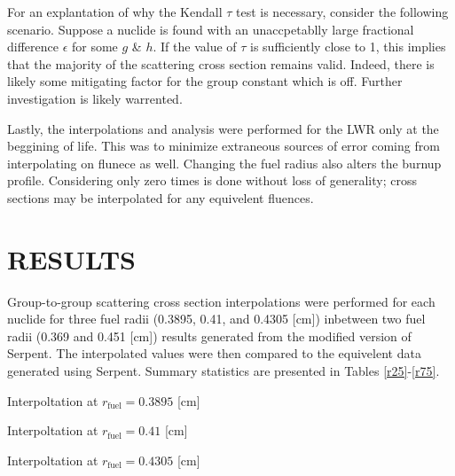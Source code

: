 \documentclass{physor2012}
\begin{document}
For an explantation of why the Kendall $\tau$ test is necessary, consider the following
scenario.  Suppose a nuclide is found with an unaccpetablly large fractional 
difference $\epsilon$ for some $g$ \& $h$.  If the value of $\tau$ is sufficiently
close to 1, this implies that the majority of the scattering cross section 
remains valid.  Indeed, there is likely some mitigating factor for the 
group constant which is off.  Further investigation is likely warrented.

Lastly, the interpolations and analysis were performed for the LWR only
at the beggining of life.  This was to minimize extraneous sources of error
coming from interpolating on flunece as well.  Changing the fuel radius also 
alters the burnup profile.  Considering only zero times is done without
loss of generality; cross sections may be interpolated for any equivelent 
fluences.

\section{RESULTS} 
\label{sec:results}

Group-to-group scattering cross section interpolations were performed for
each nuclide for three fuel radii (0.3895, 0.41, and 0.4305 [cm]) inbetween two 
fuel radii (0.369 and 0.451 [cm]) results generated from the modified version of
Serpent.  The interpolated values were then compared to the equivelent data 
generated using Serpent.  Summary statistics are presented in Tables \ref{r25}-\ref{r75}.

\begin{table}[htbp]
\begin{center}
\caption{Interpoltation at $r_{\mbox{fuel}}=0.3895$ [cm]}
\label{r25}

\end{center}
\end{table}

\begin{table}[htbp]
\begin{center}
\caption{Interpoltation at $r_{\mbox{fuel}}=0.41$ [cm]}
\label{r50}

\end{center}
\end{table}

\begin{table}[htbp]
\begin{center}
\caption{Interpoltation at $r_{\mbox{fuel}}=0.4305$ [cm]}
\label{r75}

\end{center}
\end{table}
\end{document}

